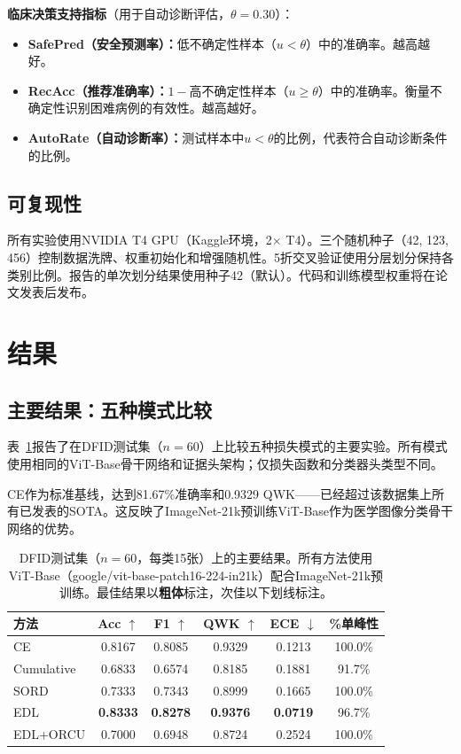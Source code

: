 \documentclass[12pt,a4paper]{ctexart}
\begin{document}
\textbf{临床决策支持指标}（用于自动诊断评估，$\theta = 0.30$）：
\begin{itemize}
    \item \textbf{SafePred（安全预测率）：}低不确定性样本（$u < \theta$）中的准确率。越高越好。
    \item \textbf{RecAcc（推荐准确率）：}$1 -{}$高不确定性样本（$u \geq \theta$）中的准确率。衡量不确定性识别困难病例的有效性。越高越好。
    \item \textbf{AutoRate（自动诊断率）：}测试样本中$u < \theta$的比例，代表符合自动诊断条件的比例。
\end{itemize}

\subsection{可复现性}

所有实验使用NVIDIA T4 GPU（Kaggle环境，2$\times$ T4）。三个随机种子（42, 123, 456）控制数据洗牌、权重初始化和增强随机性。5折交叉验证使用分层划分保持各类别比例。报告的单次划分结果使用种子42（默认）。代码和训练模型权重将在论文发表后发布。

\section{结果}

\subsection{主要结果：五种模式比较}

表~\ref{tab:df_main}报告了在DFID测试集（$n=60$）上比较五种损失模式的主要实验。所有模式使用相同的ViT-Base骨干网络和证据头架构；仅损失函数和分类器头类型不同。

CE作为标准基线，达到81.67\%准确率和0.9329 QWK——已经超过该数据集上所有已发表的SOTA。这反映了ImageNet-21k预训练ViT-Base作为医学图像分类骨干网络的优势。

\begin{table}[htbp]
\centering
\caption{DFID测试集（$n=60$，每类15张）上的主要结果。所有方法使用ViT-Base（google/vit-base-patch16-224-in21k）配合ImageNet-21k预训练。最佳结果以\textbf{粗体}标注，次佳以下划线标注。}
\label{tab:df_main}
\begin{tabular}{lccccc}
\toprule
\textbf{方法} & \textbf{Acc $\uparrow$} & \textbf{F1 $\uparrow$} & \textbf{QWK $\uparrow$} & \textbf{ECE $\downarrow$} & \textbf{\%单峰性} \\
\midrule
CE & 0.8167 & 0.8085 & 0.9329 & 0.1213 & 100.0\% \\
Cumulative & 0.6833 & 0.6574 & 0.8185 & 0.1881 & 91.7\% \\
SORD & 0.7333 & 0.7343 & 0.8999 & 0.1665 & 100.0\% \\
EDL & \textbf{0.8333} & \textbf{0.8278} & \textbf{0.9376} & \textbf{0.0719} & 96.7\% \\
EDL+ORCU & 0.7000 & 0.6948 & 0.8724 & 0.2524 & 100.0\% \\
\bottomrule
\end{tabular}
\end{table}
\end{document}
